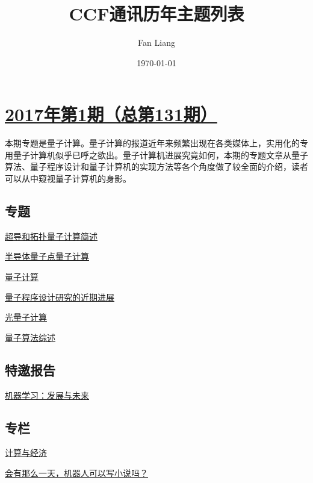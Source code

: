 \documentclass[a4paper]{article}
\begin{document}
\title{CCF通讯历年主题列表}
\author{Fan Liang}
\date{\today}
\maketitle


\section{\href{http://history.ccf.org.cn/sites/ccf/jsjtbbd.jsp?contentId=2968168085256}{\textbf{2017年第1期（总第131期）}}}
本期专题是量子计算。量子计算的报道近年来频繁出现在各类媒体上，实用化的专用量子计算机似乎已呼之欲出。量子计算机进展究竟如何，本期的专题文章从量子算法、量子程序设计和量子计算机的实现方法等各个角度做了较全面的介绍，读者可以从中窥视量子计算机的身影。
\subsection{专题}
\href{http://history.ccf.org.cn/resources/1190201776262/2017/01/11/dengmingtang.pdf}{超导和拓扑量子计算简述}

\href{http://history.ccf.org.cn/resources/1190201776262/2017/01/11/lihaio.pdf}{半导体量子点量子计算}

\href{http://history.ccf.org.cn/resources/1190201776262/2017/01/11/1-wujunjie.pdf}{量子计算}

\href{http://history.ccf.org.cn/resources/1190201776262/2017/01/11/yingmingsheng.pdf}{量子程序设计研究的近期进展}

\href{http://history.ccf.org.cn/resources/1190201776262/2017/01/11/wujunjie2.pdf}{光量子计算}

\href{http://history.ccf.org.cn/resources/1190201776262/2017/01/11/Ashley.pdf}{量子算法综述}

\subsection{特邀报告}
\href{http://history.ccf.org.cn/resources/1190201776262/2017/01/11/cncc-zhouzhihua.pdf}{机器学习：发展与未来}

\subsection{专栏}
\href{http://history.ccf.org.cn/resources/1190201776262/2017/01/11/tangpingzhong.pdf}{计算与经济}

\href{http://history.ccf.org.cn/resources/1190201776262/2017/01/11/songruihua.pdf}{会有那么一天，机器人可以写小说吗？}
\end{document}
